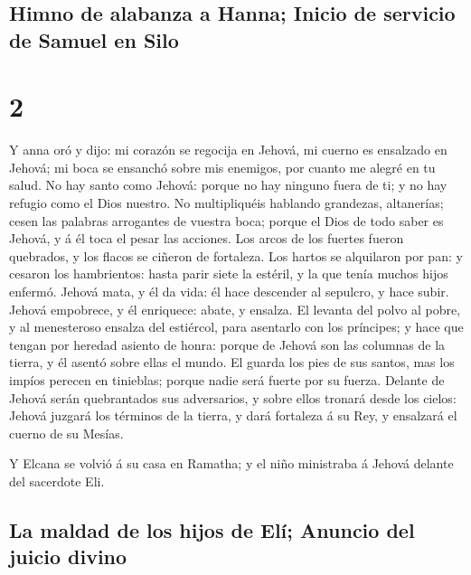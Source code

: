 \hypertarget{himno-de-alabanza-a-hanna-inicio-de-servicio-de-samuel-en-silo}{%
\subsection{Himno de alabanza a Hanna; Inicio de servicio de Samuel en
Silo}\label{himno-de-alabanza-a-hanna-inicio-de-servicio-de-samuel-en-silo}}

\hypertarget{section-1}{%
\section{2}\label{section-1}}

 Y anna oró y dijo: mi corazón se regocija en Jehová, mi
cuerno es ensalzado en Jehová; mi boca se ensanchó sobre mis enemigos,
por cuanto me alegré en tu salud.  No hay santo como Jehová:
porque no hay ninguno fuera de ti; y no hay refugio como el Dios
nuestro.  No multipliquéis hablando grandezas, altanerías;
cesen las palabras arrogantes de vuestra boca; porque el Dios de todo
saber es Jehová, y á él toca el pesar las acciones.  Los
arcos de los fuertes fueron quebrados, y los flacos se ciñeron de
fortaleza.  Los hartos se alquilaron por pan: y cesaron los
hambrientos: hasta parir siete la estéril, y la que tenía muchos hijos
enfermó.  Jehová mata, y él da vida: él hace descender al
sepulcro, y hace subir.  Jehová empobrece, y él enriquece:
abate, y ensalza.  El levanta del polvo al pobre, y al
menesteroso ensalza del estiércol, para asentarlo con los príncipes; y
hace que tengan por heredad asiento de honra: porque de Jehová son las
columnas de la tierra, y él asentó sobre ellas el mundo.  El
guarda los pies de sus santos, mas los impíos perecen en tinieblas;
porque nadie será fuerte por su fuerza.  Delante de Jehová
serán quebrantados sus adversarios, y sobre ellos tronará desde los
cielos: Jehová juzgará los términos de la tierra, y dará fortaleza á su
Rey, y ensalzará el cuerno de su Mesías.

 Y Elcana se volvió á su casa en Ramatha; y el niño
ministraba á Jehová delante del sacerdote Eli.

\hypertarget{la-maldad-de-los-hijos-de-eluxed-anuncio-del-juicio-divino}{%
\subsection{La maldad de los hijos de Elí; Anuncio del juicio
divino}\label{la-maldad-de-los-hijos-de-eluxed-anuncio-del-juicio-divino}}

